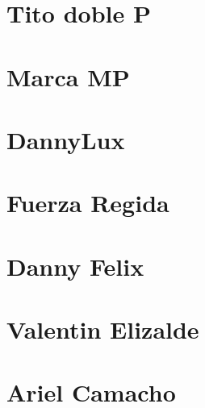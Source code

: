 \documentclass{article}
\begin{document}
\section{Tito doble P}



\section{Marca MP}


\section{DannyLux}


\section{Fuerza Regida}




\section{Danny Felix}

\section{Valentin Elizalde}


\section{Ariel Camacho}



\end{document}
